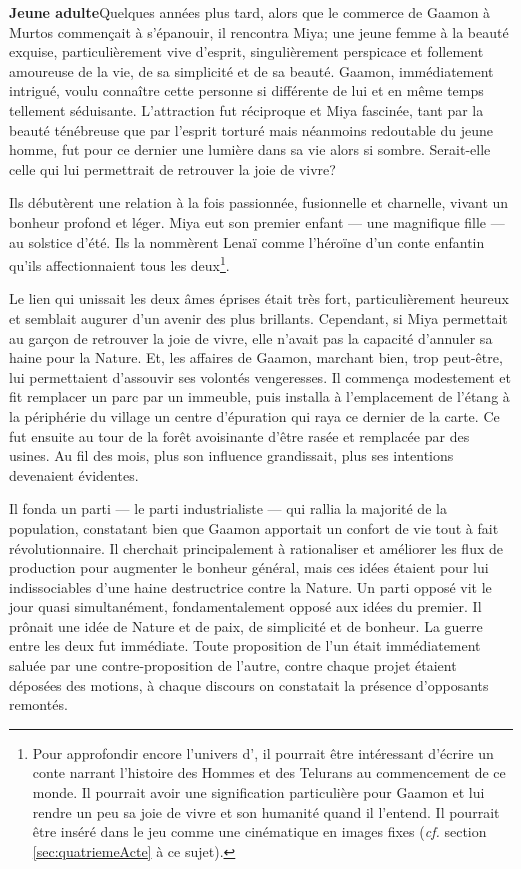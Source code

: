 \textbf{Jeune adulte}\quad Quelques années plus tard, alors que le commerce de Gaamon à Murtos commençait à s'épanouir, il rencontra Miya; une jeune femme à la beauté exquise, particulièrement vive d'esprit, singulièrement perspicace et follement amoureuse de la vie, de sa simplicité et de sa beauté. Gaamon, immédiatement intrigué, voulu connaître cette personne si différente de lui et en même temps tellement séduisante. L'attraction fut réciproque et Miya fascinée, tant par la beauté ténébreuse que par l'esprit torturé mais néanmoins redoutable du jeune homme, fut pour ce dernier une lumière dans sa vie alors si sombre. Serait-elle celle qui lui permettrait de retrouver la joie de vivre?

Ils débutèrent une relation à la fois passionnée, fusionnelle et charnelle, vivant un bonheur profond et léger. Miya eut son premier enfant --- une magnifique fille --- au solstice d'été. Ils la nommèrent Lenaï comme l'héroïne d'un conte enfantin qu'ils affectionnaient tous les deux\footnote{Pour approfondir encore l'univers d'\nomUnivers, il pourrait être intéressant d'écrire un conte narrant l'histoire des Hommes et des Telurans au commencement de ce monde. Il pourrait avoir une signification particulière pour Gaamon et lui rendre un peu sa joie de vivre et son humanité quand il l'entend. Il pourrait être inséré dans le jeu comme une cinématique en images fixes (\textit{cf.} section \ref{sec:quatriemeActe} à ce sujet).}.

Le lien qui unissait les deux âmes éprises était très fort, particulièrement heureux et semblait augurer d'un avenir des plus brillants. Cependant, si Miya permettait au garçon de retrouver la joie de vivre, elle n'avait pas la capacité d'annuler sa haine pour la Nature. Et, les affaires de Gaamon, marchant bien, trop peut-être, lui permettaient d'assouvir ses volontés vengeresses. Il commença modestement et fit remplacer un parc par un immeuble, puis installa à l'emplacement de l'étang à la périphérie du village un centre d'épuration qui raya ce dernier de la carte. Ce fut ensuite au tour de la forêt avoisinante d'être rasée et remplacée par des usines. Au fil des mois, plus son influence grandissait, plus ses intentions devenaient évidentes.

Il fonda un parti --- le parti industrialiste --- qui rallia la majorité de la population, constatant bien que Gaamon apportait un confort de vie tout à fait révolutionnaire. Il cherchait principalement à rationaliser et améliorer les flux de production pour augmenter le bonheur général, mais ces idées étaient pour lui indissociables d'une haine destructrice contre la Nature. Un parti opposé vit le jour quasi simultanément, fondamentalement opposé aux idées du premier. Il prônait une idée de Nature et de paix, de simplicité et de bonheur. La guerre entre les deux fut immédiate. Toute proposition de l'un était immédiatement saluée par une contre-proposition de l'autre, contre chaque projet étaient déposées des motions, à chaque discours on constatait la présence d'opposants remontés.

